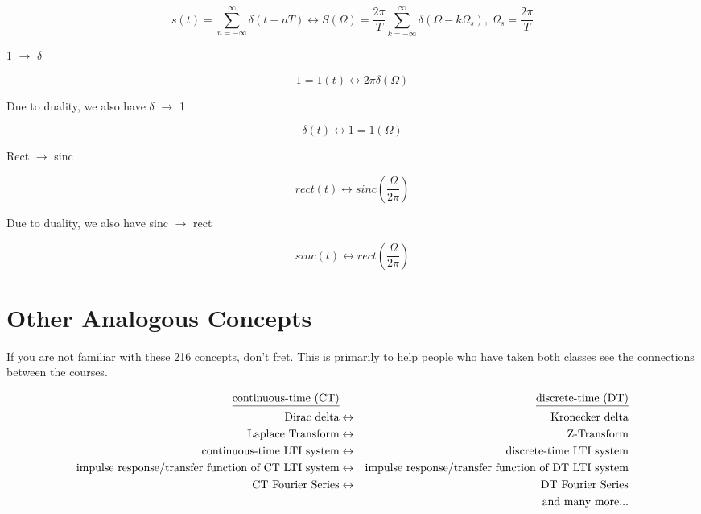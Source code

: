 \documentclass[11pt]{article}
\begin{document}
\[
s(t) = \sum_{n=-\infty}^\infty \delta(t-nT) \leftrightarrow S(\Omega) = \frac{2 \pi}{T} \sum_{k=-\infty}^\infty \delta(\Omega - k\Omega_s),\ \Omega_s = \frac{2\pi}{T}
\]

1 $\rightarrow$ $\delta$

\[ 1 = 1(t) \leftrightarrow 2 \pi \delta(\Omega)
\]

Due to duality, we also have $\delta$ $\rightarrow$ 1

\[ \delta(t) \leftrightarrow 1 = 1(\Omega)
\]

Rect $\rightarrow$ sinc

\[ rect(t) \leftrightarrow sinc\left(\frac{\Omega} {2\pi}\right)
\]

Due to duality, we also have sinc $\rightarrow$ rect

\[ sinc(t) \leftrightarrow rect\left(\frac{\Omega}{2 \pi}\right)
\]

\section{Other Analogous Concepts}
If you are not familiar with these 216 concepts, don't fret. This is primarily to help people who have taken both classes see the connections between the courses. 

\begin{eqnarray*}
\text{\underline{continuous-time (CT)}} & & \text{\underline{discrete-time (DT)}}  \\
\text{Dirac delta} &\leftrightarrow& \text{Kronecker delta} \\
\text{Laplace Transform} &\leftrightarrow& \text{Z-Transform} \\
\text{continuous-time LTI system} &\leftrightarrow& \text{discrete-time LTI system} \\
\text{impulse response/transfer function of CT LTI system} &\leftrightarrow& \text{impulse response/transfer function of DT LTI system} \\
\text{CT Fourier Series} &\leftrightarrow& \text{DT Fourier Series} \\
&& \text{ and many more...}
\end{eqnarray*}
\end{document}
